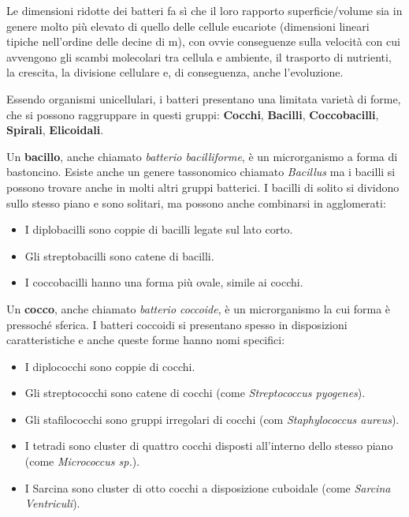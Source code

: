\documentclass[../main.tex]{subfiles}
\begin{document}
Le dimensioni ridotte dei batteri fa sì che il loro rapporto superficie/volume sia in genere molto più elevato di quello delle cellule eucariote (dimensioni lineari tipiche nell'ordine delle decine di \micro m), con ovvie conseguenze sulla velocità con cui avvengono gli scambi molecolari tra cellula e ambiente, il trasporto di nutrienti, la crescita, la divisione cellulare e, di conseguenza, anche l'evoluzione. \cite{deho_galli_2020}

Essendo organismi unicellulari, i batteri presentano una limitata varietà di forme, che si possono raggruppare in questi gruppi: \textbf{Cocchi}, \textbf{Bacilli}, \textbf{Coccobacilli}, \textbf{Spirali}, \textbf{Elicoidali}.

Un \textbf{bacillo}, anche chiamato \textit{batterio bacilliforme}, è un microrganismo a forma di bastoncino. Esiste anche un genere tassonomico chiamato \textit{Bacillus} ma i bacilli si possono trovare anche in molti altri gruppi batterici. I bacilli di solito si dividono sullo stesso piano e sono solitari, ma possono anche combinarsi in agglomerati:

\begin{itemize}
	\itemsep0em 
	\item I diplobacilli sono coppie di bacilli legate sul lato corto.
	\item Gli streptobacilli sono catene di bacilli.
	\item I coccobacilli hanno una forma più ovale, simile ai cocchi.
\end{itemize}

Un \textbf{cocco}, anche chiamato \textit{batterio coccoide}, è un microrganismo la cui forma è pressoché sferica. I batteri coccoidi si presentano spesso in disposizioni caratteristiche e anche queste forme hanno nomi specifici: \cite{zapun_2008}

\begin{itemize}
	\itemsep0em 
	\item I diplococchi sono coppie di cocchi.
	\item Gli streptococchi sono catene di cocchi (come \textit{Streptococcus pyogenes}).
	\item Gli stafilococchi sono gruppi irregolari di cocchi (com \textit{Staphylococcus aureus}).
	\item I tetradi sono cluster di quattro cocchi disposti all'interno dello stesso piano (come \textit{Micrococcus sp.}).
	\item I Sarcina sono cluster di otto cocchi a disposizione cuboidale (come \textit{Sarcina Ventriculi}).
\end{itemize}
\end{document}
